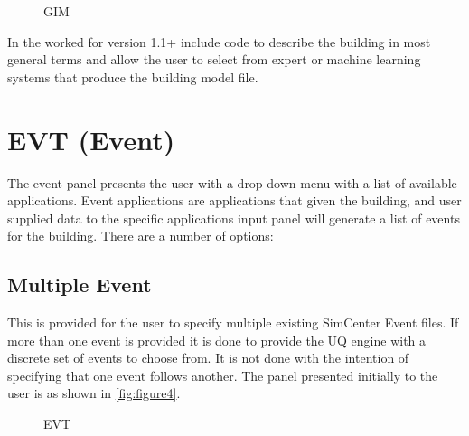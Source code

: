 \begin{enumerate}
\begin{figure}[!htbp]
  \caption{GIM}
  \label{fig:figure3}
\end{figure}

In the worked for version 1.1+ include code to describe the building
in most general terms and allow the user to select from expert or
machine learning systems that produce the building model file.

\end{enumerate}

\section{EVT (Event)}
The event panel presents the user with a drop-down menu with a list of
available applications.  Event applications are applications that
given the building, and user supplied data to the specific
applications input panel will generate a list of events for the
building. There are a number of options:

\subsection{Multiple Event}

This is provided for the user to specify multiple existing SimCenter
Event files.  If more than one event is provided it is done to provide
the UQ engine with a discrete set of events to choose from.  It is not
done with the intention of specifying that one event follows another.
The panel presented initially to the user is as shown
in \autoref{fig:figure4}.

\begin{figure}[!htbp]
  \caption{EVT}
  \label{fig:figure4}
\end{figure}

